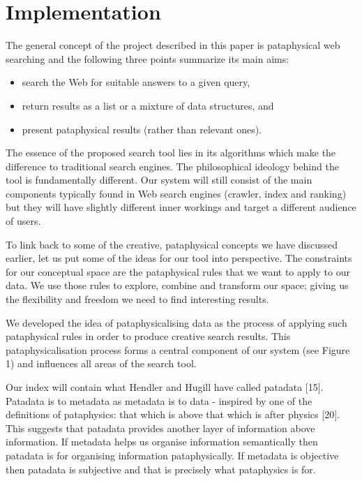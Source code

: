 \section{Implementation}

The general concept of the project described in this paper is pataphysical web searching and the following three points summarize its main aims:

\begin{itemize}
\item search the Web for suitable answers to a given query,
\item return results as a list or a mixture of data structures, and
\item present pataphysical results (rather than relevant ones).
\end{itemize}

The essence of the proposed search tool lies in its algorithms which make the difference to traditional search engines. The philosophical ideology behind the tool is fundamentally different. Our system will still consist of the main components typically found in Web search engines (crawler, index and ranking) but they will have slightly different inner workings and target a different audience of users.

To link back to some of the creative, pataphysical concepts we have discussed earlier, let us put some of the ideas for our tool into perspective. The constraints for our conceptual space are the pataphysical rules that we want to apply to our data. We use those rules to explore, combine and transform our space; giving us the flexibility and freedom we need to find interesting results.

We developed the idea of pataphysicalising data as the process of applying such pataphysical rules in order to produce creative search results. This pataphysicalisation process forms a central component of our system (see Figure 1) and influences all areas of the search tool.

Our index will contain what Hendler and Hugill have called patadata [15].  Patadata is to metadata as metadata is to data - inspired by one of the definitions of pataphysics: that which is above that which is after physics [20]. This suggests that patadata provides another layer of information above information.  If metadata helps us organise information semantically then patadata is for organising information pataphysically. If metadata is objective then patadata is subjective and that is precisely what pataphysics is for.

